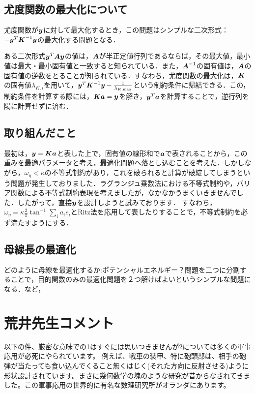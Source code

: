 \documentclass[11pt]{jsarticle}
\begin{document}
		\subsection{尤度関数の最大化について}
			尤度関数が$ \boldsymbol{y} $に対して最大化するとき，この問題はシンプルな二次形式：$ -\boldsymbol{y}^T \boldsymbol{K}^{-1} \boldsymbol{y} $の最大化する問題となる．
			
			ある二次形式$ \boldsymbol{y}^T \boldsymbol{A} \boldsymbol{y}$の値は，$ \boldsymbol{A} $が半正定値行列であるならば，その最大値，最小値は最大・最小固有値と一致すると知られている．また，$ \boldsymbol{A}^{-1} $の固有値は，$ \boldsymbol{A} $の固有値の逆数をとることが知られている．すなわち，尤度関数の最大化は，$ \boldsymbol{K} $の固有値$ \lambda_{K,i} $を用いて，$ \boldsymbol{y}^T \boldsymbol{K}^{-1} \boldsymbol{y} - \frac{1}{\lambda_{K,\max}} $という制約条件に帰結できる．この，制約条件を計算する際には，$ \boldsymbol{K} \boldsymbol{a} = \boldsymbol{y} $を解き，$ \boldsymbol{y}^T \boldsymbol{a} $を計算することで，逆行列を陽に計算せずに済む．
			
		\subsection{取り組んだこと}
			最初は，$ \boldsymbol{y} = \boldsymbol{K} \boldsymbol{a}$と表した上で，固有値の線形和で$ \boldsymbol{a} $で表されることから，この重みを最適パラメータと考え，最適化問題へ落とし込むことを考えた．しかしながら，$ \omega_{\eta} <\kappa$の不等式制約があり，これを破られると計算が破綻してしまうという問題が発生しておりました．ラグランジュ乗数法における不等式制約や，バリア関数による不等式制約表現を考えましたが，なかなかうまくいきませんでした．したがって，直接$ \boldsymbol{y} $を設計しようと試みております．
			すなわち，$\omega_{\eta} = \kappa \frac{2}{\pi} \tan^{-1} \sum_i a_i e_i $とRitz法を応用して表したりすることで，不等式制約を必ず満たすようにする．
		\subsection{母線長の最適化}
			どのように母線を最適化するか:ポテンシャルエネルギー？問題を二つに分割することで，目的関数のみの最適化問題を２つ解けばよいというシンプルな問題になる．など，
	\section{荒井先生コメント}
		以下の件、厳密な意味での1はすぐには思いつきませんが2については多くの軍事応用が必死にやられています。
		例えば、戦車の装甲、特に砲頭部は、相手の砲弾が当たっても食い込んでくること無くはじく(それた方向に反射させる)ように形状設計されています。まさに幾何数学の塊のような研究が昔からなされてきました。この軍事応用の世界的に有名な数理研究所がオランダにあります。
		
\end{document}

